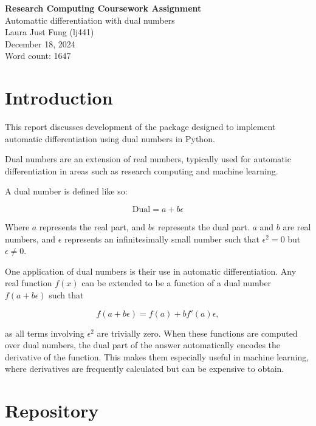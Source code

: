 \documentclass[11pt,a4paper]{article}
\begin{document}
 

\begin{center}
    \LARGE{\textbf{Research Computing Coursework Assignment}}
    \\
    \Large{{Automattic differentiation with dual numbers}}
    \\
    \large{Laura Just Fung (lj441)}
    \\
    December 18, 2024
    \\
    Word count: 1647
\end{center}


\section{Introduction}
This report discusses development of the package designed to implement automatic differentiation using dual numbers in Python. 

Dual numbers are an extension of real numbers, typically used for automatic differentiation in areas such as research computing and machine learning.

A dual number is defined like so:

\begin{equation}
    \mathrm{Dual} = a + b \epsilon
\end{equation}

Where $a$ represents the real part, and $b\epsilon$ represents the dual part. $a$ and $b$ are real numbers, and $\epsilon$ represents an infinitesimally small number such that $\epsilon^2 = 0$ but $\epsilon \neq 0$.

One application of dual numbers is their use in automatic differentiation. Any real function $f(x)$ can be extended to be a function of a dual number $f(a+b \epsilon)$ such that

\begin{equation}
    f(a + b \epsilon) = f(a) + b f'(a)\epsilon,
\end{equation}

as all terms involving $\epsilon^2$ are trivially zero. When these functions are computed over dual numbers, the dual part of the answer automatically encodes the derivative of the function. This makes them especially useful in machine learning, where derivatives are frequently calculated but can be expensive to obtain.

\section{Repository}
\end{document}
